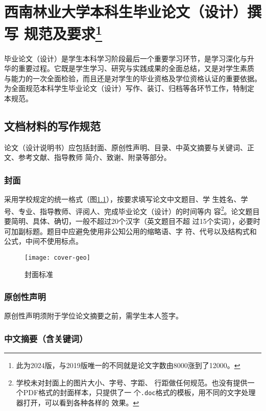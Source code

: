 \chapter[西南林大论文格式规范]{西南林业大学本科生毕业论文（设计）撰写
  规范及要求\footnote{此为2024版，与2019版唯一的不同就是论文字数由8000涨到了12000。}}
\label{cha:std}

毕业论文（设计）是学生本科学习阶段最后一个重要学习环节，是学习深化与升
华的重要过程。它既是学生学习、研究与实践成果的全面总结，又是对学生素质
与能力的一次全面检验，而且还是对学生的毕业资格及学位资格认证的重要依据。
为全面规范本科学生毕业论文（设计）写作、装订、归档等各环节工作，特制定
本规范。

\section{文档材料的写作规范}

论文（设计说明书）应包括封面、原创性声明、目录、中英文摘要与关键词、正文、参考文献、指导教师
简介、致谢、附录等部分。

\subsection{封面}

采用学校规定的统一格式（图\ref{fig:cover}），按要求填写论文中文题目、学
生姓名、学号、专业、指导教师、评阅人、完成毕业论文（设计）的时间等内
容{\bug}\footnote{学校未对封面上的图片大小、字号、字距、
  行距做任何规范。也没有提供一个PDF格式的封面样本，只提供了一
  个\texttt{.doc}格式的模板，用不同的文字处理器打开，可以看到各种各样的
  效果。}。论文题目要简明、具体、确切，一般不超过20个汉字（英文题目不超
过15个实词），必要时可加副标题。题目中应避免使用非公知公用的缩略语、字
符、代号以及结构式和公式，中间不使用标点。

\begin{figure}
  \centering
  \texttt{[image: cover-geo]}
  \caption{封面标准\label{fig:cover}}  
\end{figure}

\subsection{原创性声明}

原创性声明须附于学位论文摘要之前，需学生本人签字。

\subsection{中文摘要（含关键词）}


